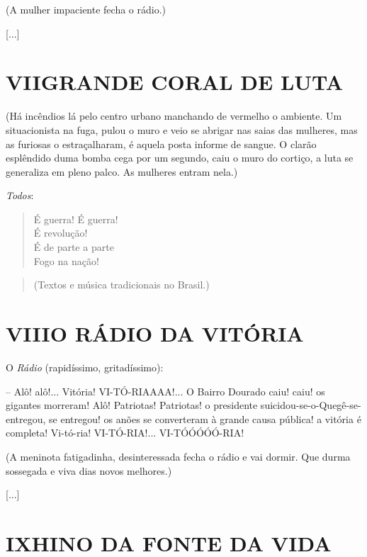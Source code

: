 \hfill{}(A mulher impaciente fecha o rádio.)

{[}...{]}

\pagebreak
\section{VII\break GRANDE CORAL DE LUTA}

\hfill\parbox{150pt}{
(Há incêndios lá pelo centro urbano manchando de vermelho o ambiente. Um
situacionista na fuga, pulou o muro e veio se abrigar nas saias das
mulheres, mas as furiosas o estraçalharam, é aquela posta informe de
sangue. O clarão esplêndido duma bomba cega por um segundo, caiu o muro
do cortiço, a luta se generaliza em pleno palco. As mulheres entram
nela.)
}

\emph{Todos}:

\begin{verse}
É guerra! É guerra!\\
É revolução!\\
É de parte a parte\\
Fogo na nação!
\end{verse}


\begin{quote}
(Textos e música tradicionais no Brasil.)
\end{quote}

\section{VIII\break O RÁDIO DA VITÓRIA}

O \emph{Rádio} (rapidíssimo, gritadíssimo):

-- Alô! alô!... Vitória! VI-TÓ-RIAAAA!... O Bairro Dourado caiu! caiu!
os gigantes morreram! Alô! Patriotas! Patriotas! o presidente
suicidou-se-o-Quegê-se-entregou, se entregou! os anões se converteram à
grande causa pública! a vitória é completa! Vi-tó-ria! VI-TÓ-RIA!...
VI-TÓÓÓÓÓ-RIA!

\hfill\parbox{150pt}{
(A meninota fatigadinha, desinteressada fecha o rádio e vai dormir. Que
durma sossegada e viva dias novos melhores.)
}

{[}...{]}

\section{IX\break HINO DA FONTE DA VIDA}

